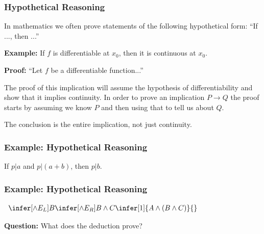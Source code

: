 \documentclass{beamer}
\begin{document}
\begin{frame}
	\frametitle{Hypothetical Reasoning}
	
	In mathematics we often prove statements of the following hypothetical form: ``If ..., then ...'' 
	
	\vspace{0.3cm}
	
	{\bf Example:} If $f$ is differentiable at $x_{0}$, then it is continuous at $x_{0}$.
	
	\vspace{0.3cm}

  	{\bf Proof:} ``Let $f$ be a differentiable function...''

  	\vspace{0.3cm}
	
	The proof of this implication will assume the hypothesis of differentiability and show that it implies continuity. In order to prove an implication $P \to Q$ the proof starts by assuming we know $P$ and then using that to tell us about $Q$. 
	
	\vspace{0.3cm} 
	
	The conclusion is the entire implication, not just continuity. 
	
	\vspace{10mm}
	
\end{frame}

\begin{frame}
\frametitle{Example: Hypothetical Reasoning}

	If $p | a$ and $p | (a + b)$, then $p | b$.

\vspace{6cm}	

\end{frame}

\begin{frame}
	\frametitle{Example: Hypothetical Reasoning}

	\begin{center}
		$\begin{array}{c}
			\infer[\land E_{L}]{B}
				{\infer[\land E_{R}]{B \land C}
					{\infer[1]{A \land (B \land C)}
						{}}}
		\end{array}$
	\end{center}

	\vspace{40mm}

	{\bf Question:} What does the deduction prove?

\end{frame}
\end{document}

